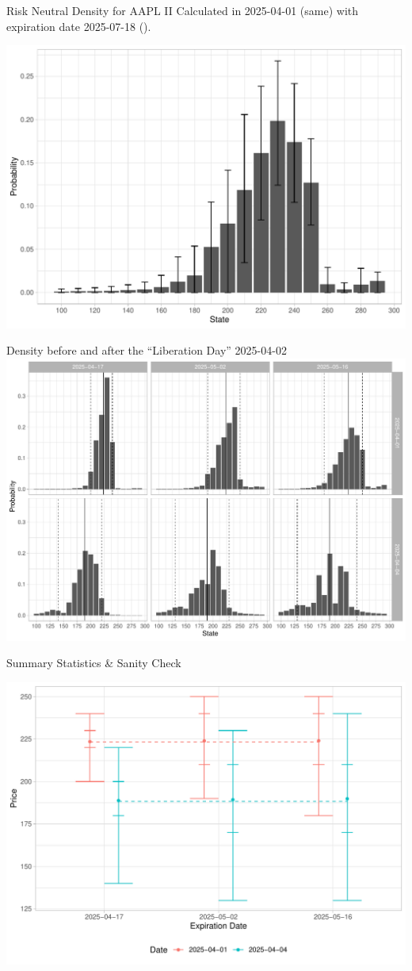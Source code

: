 \documentclass[10pt,aspectratio=43]{beamer}
\begin{document}
\begin{frame}{Risk Neutral Density for AAPL II}
    Calculated in 2025-04-01 (same) with expiration date 2025-07-18 ().
    \begin{center}
        \includegraphics[width=0.8\linewidth]{betas_01_3.pdf}
    \end{center}
\end{frame}



\begin{frame}{Density before and after the ``Liberation Day'' 2025-04-02}\centering
    \includegraphics[width=0.8\linewidth]{betas.pdf}
\end{frame}
 

\begin{frame}{Summary Statistics \& Sanity Check}
    \begin{center}
        \includegraphics[width=0.9\linewidth]{summaries_plot.pdf}
    \end{center}
\end{frame}
\end{document}
